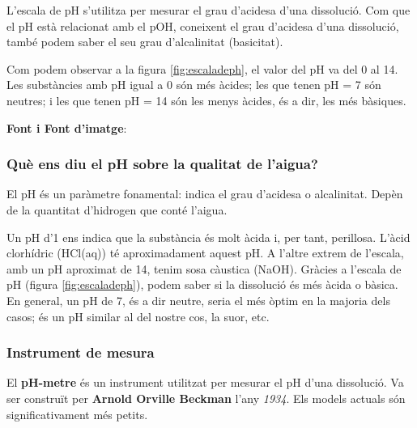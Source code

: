 L'escala de pH s'utilitza per mesurar el grau d'acidesa d'una dissolució. Com que el pH està relacionat amb el pOH, coneixent el grau d'acidesa d'una dissolució, també podem saber el seu grau d'alcalinitat (basicitat).%

Com podem observar a la figura \ref{fig:escaladeph}, el valor del pH va del 0 al 14. Les substàncies amb pH igual a 0 són més àcides; les que tenen pH = 7 són neutres; i les que tenen pH = 14 són les menys àcides, és a dir, les més bàsiques.

\textbf{Font i Font d'imatge}: \cite{PH}

\subsubsection{Què ens diu el pH sobre la qualitat de l'aigua?}
El pH és un paràmetre fonamental: indica el grau d'acidesa o alcalinitat. Depèn de la quantitat d'hidrogen que conté l'aigua.

Un pH d'1 ens indica que la substància és molt àcida i, per tant, perillosa. L'àcid clorhídric (HCl(aq)) té aproximadament aquest pH. A l'altre extrem de l'escala, amb un pH aproximat de 14, tenim sosa càustica (NaOH). Gràcies a l'escala de pH (figura \ref{fig:escaladeph}), podem saber si la dissolució és més àcida o bàsica. En general, un pH de 7, és a dir neutre, seria el més òptim en la majoria dels casos; és un pH similar al del nostre cos, la suor, etc.


\subsubsection{Instrument de mesura}
El \textbf{pH-metre} és un instrument utilitzat per mesurar el pH d’una dissolució. Va ser construït per \textbf{Arnold Orville Beckman} l’any \textit{1934}. Els models actuals són significativament més petits.

